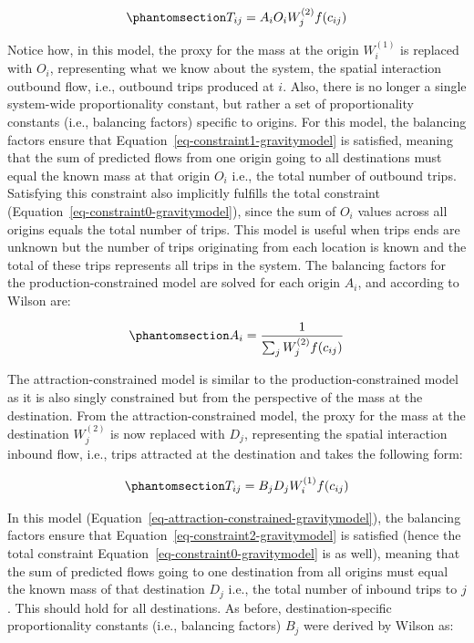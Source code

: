 \documentclass[
]{article}
\begin{document}
\begin{equation}\phantomsection\label{eq-production-constrained-gravitymodel}{
T_{ij} = A_i O_i W_j^{(2)} f(c_{ij})
}\end{equation}

Notice how, in this model, the proxy for the mass at the origin
\(W_i^{(1)}\) is replaced with \(O_i\), representing what we know about
the system, the spatial interaction outbound flow, i.e., outbound trips
produced at \(i\). Also, there is no longer a single system-wide
proportionality constant, but rather a set of proportionality constants
(i.e., balancing factors) specific to origins. For this model, the
balancing factors ensure that Equation~\ref{eq-constraint1-gravitymodel}
is satisfied, meaning that the sum of predicted flows from one origin
going to all destinations must equal the known mass at that origin
\(O_i\) i.e., the total number of outbound trips. Satisfying this
constraint also implicitly fulfills the total constraint
(Equation~\ref{eq-constraint0-gravitymodel}), since the sum of \(O_i\)
values across all origins equals the total number of trips. This model
is useful when trips ends are unknown but the number of trips
originating from each location is known and the total of these trips
represents all trips in the system. The balancing factors for the
production-constrained model are solved for each origin \(A_i\), and
according to Wilson are:

\begin{equation}\phantomsection\label{eq-production-constrained-balancing-factor}{
A_i = \frac{1}{\sum_j W_j^{(2)} f(c_{ij})}
}\end{equation}

The attraction-constrained model is similar to the
production-constrained model as it is also singly constrained but from
the perspective of the mass at the destination. From the
attraction-constrained model, the proxy for the mass at the destination
\(W_j^{(2)}\) is now replaced with \(D_j\), representing the spatial
interaction inbound flow, i.e., trips attracted at the destination and
takes the following form:

\begin{equation}\phantomsection\label{eq-attraction-constrained-gravitymodel}{
T_{ij} = B_j D_j W_i^{(1)} f(c_{ij})
}\end{equation}

In this model (Equation~\ref{eq-attraction-constrained-gravitymodel}),
the balancing factors ensure that
Equation~\ref{eq-constraint2-gravitymodel} is satisfied (hence the total
constraint Equation~\ref{eq-constraint0-gravitymodel} is as well),
meaning that the sum of predicted flows going to one destination from
all origins must equal the known mass of that destination \(D_j\) i.e.,
the total number of inbound trips to \(j\). This should hold for all
destinations. As before, destination-specific proportionality constants
(i.e., balancing factors) \(B_j\) were derived by Wilson as:
\end{document}
